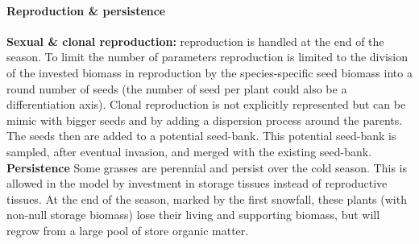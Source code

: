 \paragraph{Reproduction \& persistence}
\textbf{Sexual \& clonal reproduction:} reproduction is handled at the end of the season. To limit the number of parameters reproduction is limited to the division of the invested biomass in reproduction by the species-specific seed biomass into a round number of seeds (the number of seed per plant could also be a differentiation axis). Clonal reproduction is not explicitly represented but can be mimic with bigger seeds and by adding a dispersion process around the parents. The seeds then are added to a potential seed-bank. This potential seed-bank is sampled, after eventual invasion, and merged with the existing seed-bank.\\

\textbf{Persistence} Some grasses are perennial and persist over the cold season. This is allowed in the model by investment in storage tissues instead of reproductive tissues.  At the end of the season, marked by the first snowfall, these plants (with non-null storage biomass) lose their living and supporting biomass, but will regrow from a large pool of store organic matter.

